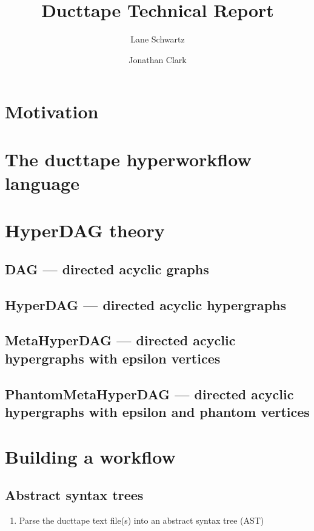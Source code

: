 \documentclass{report}
\title{Ducttape Technical Report}
\author{Lane Schwartz \and Jonathan Clark}
\begin{document}
\maketitle
\tableofcontents

\chapter{Motivation}

\chapter{The ducttape hyperworkflow language}

\chapter{HyperDAG theory}

\section{DAG --- directed acyclic graphs}

\section{HyperDAG --- directed acyclic hypergraphs}

\section{MetaHyperDAG --- directed acyclic hypergraphs with epsilon vertices}

\section{PhantomMetaHyperDAG --- directed acyclic hypergraphs with epsilon and phantom vertices }



\chapter{Building a workflow}

\section{Abstract syntax trees}

\begin{enumerate}
\item Parse the ducttape text file(s) into an abstract syntax tree (AST)
\end{enumerate}
\end{document}
